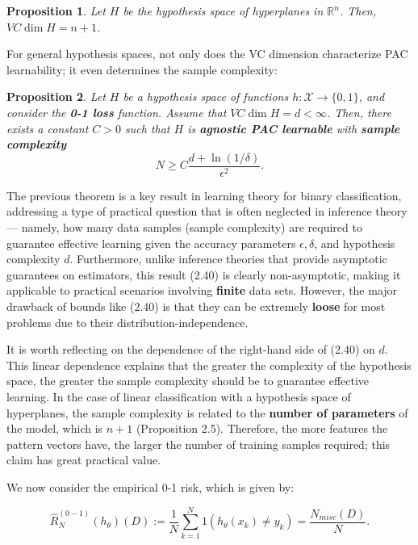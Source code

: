 \documentclass{report}
\newtheorem{proposition}{Proposition}[chapter]
\begin{document}
\begin{proposition}
Let $H$ be the hypothesis space of hyperplanes in $\mathbb{R}^n$. Then, $VC\dim H = n + 1$.
\end{proposition}

For general hypothesis spaces, not only does the VC dimension characterize PAC learnability; it even determines the sample complexity:
\begin{proposition}
Let $H$ be a hypothesis space of functions $h : \mathcal{X} \to \{0, 1\}$, and consider the \textbf{0-1 loss} function. Assume that $VC\dim H = d < \infty$. Then, there exists a constant $C> 0$ such that $H$ is \textbf{agnostic PAC learnable} with \textbf{sample complexity}
\begin{equation}
 N \geq C\frac{d + \ln (1/\delta)}{\epsilon^2}.
\end{equation}
\end{proposition}

The previous theorem is a key result in learning theory for binary classification, addressing a type of practical question that is often neglected in inference theory — namely, how many data samples (sample complexity) are required to guarantee effective learning given the accuracy parameters $\epsilon, \delta$, and hypothesis complexity $d$. Furthermore, unlike inference theories that provide asymptotic guarantees on estimators, this result (2.40) is clearly non-asymptotic, making it applicable to practical scenarios involving \textbf{finite} data sets. However, the major drawback of bounds like (2.40) is that they can be extremely \textbf{loose} for most problems due to their distribution-independence.

It is worth reflecting on the dependence of the right-hand side of (2.40) on $d$. This linear dependence explains that the greater the complexity of the hypothesis space, the greater the sample complexity should be to guarantee effective learning. In the case of linear classification with a hypothesis space of hyperplanes, the sample complexity is related to the \textbf{number of parameters} of the model, which is $n + 1$ (Proposition 2.5). Therefore, the more features the pattern vectors have, the larger the number of training samples required; this claim has great practical value.

We now consider the empirical 0-1 risk, which is given by:

\begin{equation}
\hat{R}^{(0-1)}_N(h_\theta)(D) := \frac{1}{N}\sum_{k=1}^{N}1(h_\theta(x_k) \neq y_k) = \frac{N_{misc}(D)}{N}.
\end{equation}
\end{document}
